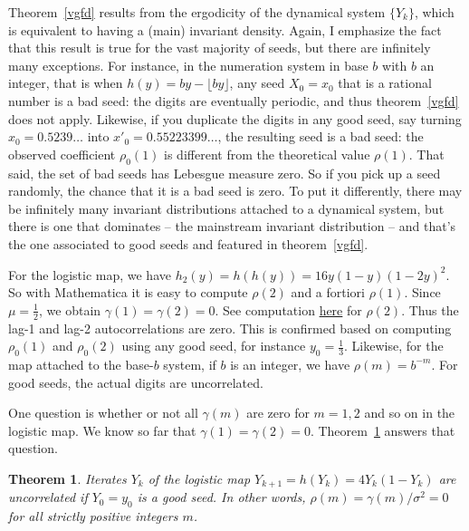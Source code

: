 \documentclass[oneside,10pt]{book}
\newtheorem{theorem}{Theorem}[section]
\begin{document}
Theorem~\ref{vgfd} results from the \textcolor{index}{ergodicity} of the dynamical system $\{Y_k\}$,
 which is equivalent to having a (main) invariant density. Again, I emphasize the fact that this result is true for the vast majority of seeds, but there are infinitely many exceptions. For instance,
 in the numeration system in base $b$ with $b$ an integer, that is when $h(y)=by - \lfloor by \rfloor$, any seed $X_0=x_0$ that is a rational number is a \textcolor{index}{bad seed}: the digits are eventually periodic, and thus theorem~\ref{vgfd} does not apply. Likewise, if you duplicate the digits in any good seed, say turning $x_0=0.5239\dots$ into $x'_0=0.55223399\dots$, the resulting seed is a bad seed: the observed coefficient
 $\rho_0(1)$ is different from the theoretical value $\rho(1)$. That said, the set of bad seeds has Lebesgue measure zero. So if you pick up a seed randomly, the chance that it is a bad seed is zero. To put it differently, there may be infinitely many invariant  distributions attached to a dynamical system, but there is one that dominates -- the mainstream invariant distribution -- and that's the one associated to good seeds  
 and featured in theorem~\ref{vgfd}. 

For the logistic map, we have $h_2(y)=h(h(y))=16 y(1-y)(1-2y)^2$. So with Mathematica it is easy to compute $\rho(2)$ and a fortiori $\rho(1)$. Since $\mu=\frac{1}{2}$, we obtain $\gamma(1)=\gamma(2)=0$.  See computation \href{https://mltblog.com/3EFVKQo}{here} for $\rho(2)$. Thus
the lag-1 and lag-2 autocorrelations are zero. This is confirmed based on computing $\rho_0(1)$ and $\rho_0(2)$ using any good seed, for instance $y_0=\frac{1}{3}$. Likewise, for the map attached to the base-$b$ system, if $b$ is an integer, we have
$\rho(m)=b^{-m}$. For good seeds, the actual digits are uncorrelated. 

One question is whether or not all $\gamma(m)$ are zero for $m=1,2$ and so on in the logistic map. We know so far  
 that $\gamma(1)=\gamma(2)=0$. Theorem~\ref{vgfd2} answers that question.

 \begin{theorem}\label{vgfd2}
Iterates $Y_k$ of the logistic map $Y_{k+1}=h(Y_k) = 4Y_k(1-Y_k)$ are uncorrelated if $Y_0=y_0$ is a good seed. 
In other words, $\rho(m)=\gamma(m)/\sigma^2 = 0$ for all strictly positive integers $m$.
\end{theorem}
\end{document}
